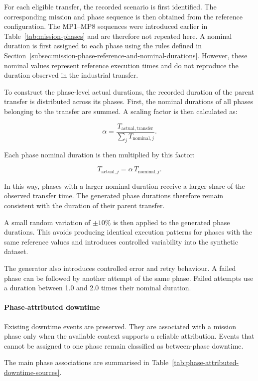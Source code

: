 For each eligible transfer, the recorded scenario is first identified. The corresponding mission and phase sequence is then obtained from the reference configuration. The MP1--MP8 sequences were introduced earlier in Table~\ref{tab:mission-phases} and are therefore not repeated here. A nominal duration is first assigned to each phase using the rules defined in Section~\ref{subsec:mission-phase-reference-and-nominal-durations}. However, these nominal values represent reference execution times and do not reproduce the duration observed in the industrial transfer.

To construct the phase-level actual durations, the recorded duration of the parent transfer is distributed across its phases. First, the nominal durations of all phases belonging to the transfer are summed. A scaling factor is then calculated as:

$$
\alpha = \frac{T_{\mathrm{actual},\mathrm{transfer}}}{\sum_j T_{\mathrm{nominal},j}}.
$$

Each phase nominal duration is then multiplied by this factor:

$$
T_{\mathrm{actual},j} = \alpha \, T_{\mathrm{nominal},j}.
$$

In this way, phases with a larger nominal duration receive a larger share of the observed transfer time. The generated phase durations therefore remain consistent with the duration of their parent transfer.

A small random variation of $\pm 10\%$ is then applied to the generated phase durations. This avoids producing identical execution patterns for phases with the same reference values and introduces controlled variability into the synthetic dataset.

The generator also introduces controlled error and retry behaviour. A failed phase can be followed by another attempt of the same phase. Failed attempts use a duration between 1.0 and 2.0 times their nominal duration.

\paragraph*{Phase-attributed downtime}
Existing downtime events are preserved. They are associated with a mission phase only when the available context supports a reliable attribution. Events that cannot be assigned to one phase remain classified as between-phase downtime.

The main phase associations are summarised in Table~\ref{tab:phase-attributed-downtime-sources}.

